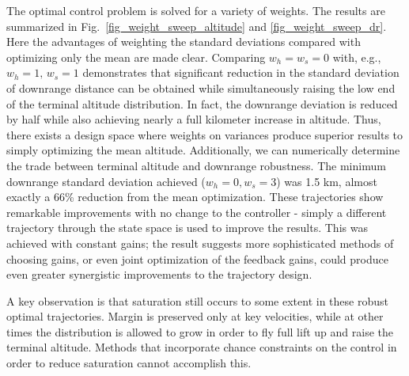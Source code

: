 \documentclass[letterpaper, paper,11pt]{AAS}
\begin{document}
The optimal control problem is solved for a variety of weights. The results are summarized in Fig.~\ref{fig_weight_sweep_altitude} and \ref{fig_weight_sweep_dr}. Here the advantages of weighting the standard deviations compared with optimizing only the mean are made clear. Comparing $w_h=w_s=0$ with, e.g., $w_h=1,\,w_s = 1$ demonstrates that significant reduction in the standard deviation of downrange distance can be obtained while simultaneously raising the low end of the terminal altitude distribution. In fact, the downrange deviation is reduced by half while also achieving nearly a full kilometer increase in altitude. Thus, there exists a design space where weights on variances produce superior results to simply optimizing the mean altitude. Additionally, we can numerically determine the trade between terminal altitude and downrange robustness. The minimum downrange standard deviation achieved ($w_h=0,w_s=3$) was 1.5 km, almost exactly a 66\% reduction from the mean optimization. These trajectories show remarkable improvements with no change to the controller - simply a different trajectory through the state space is used to improve the results.
This was achieved with constant gains; the result suggests more sophisticated methods of choosing gains, or even joint optimization of the feedback gains, could produce even greater synergistic improvements to the trajectory design. 

A key observation is that saturation still occurs to some extent in these robust optimal trajectories. Margin is preserved only at key velocities, while at other times the distribution is allowed to grow in order to fly full lift up and raise the terminal altitude. Methods that incorporate chance constraints on the control in order to reduce saturation cannot accomplish this.
\end{document}
